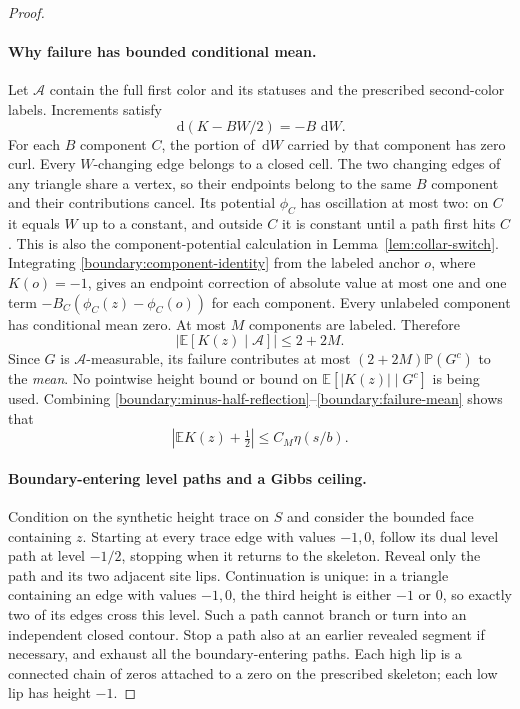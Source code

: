 \documentclass[11pt]{article}
\theoremstyle{definition}
\theoremstyle{remark}
\numberwithin{equation}{section}
\begin{document}
\begin{proof}
\paragraph{Why failure has bounded conditional mean.}
Let $\mathcal A$ contain the full first color and its statuses and
the prescribed second-color labels.  Increments satisfy
\begin{equation}
 \,\mathrm d(K-BW/2)=-B\,\,\mathrm d W.
 \label{boundary:component-identity}
\end{equation}
For each $B$ component $C$, the portion of $\,\mathrm d W$ carried by that
component has zero curl.  Every $W$-changing edge belongs to a closed
cell.  The two changing edges of any triangle share a vertex, so
their endpoints belong to the same $B$ component and their
contributions cancel.  Its potential $\phi_C$ has oscillation at most two:
on $C$ it equals $W$ up to a constant, and outside $C$ it is
constant until a path first hits $C$.  This is also the
component-potential calculation in Lemma~\ref{lem:collar-switch}.
Integrating \eqref{boundary:component-identity} from the labeled
anchor $o$, where $K(o)=-1$, gives an endpoint correction of absolute
value at most one and one term
$-B_C(\phi_C(z)-\phi_C(o))$ for each component.  Every unlabeled
component has conditional mean zero.  At most $M$ components are
labeled.  Therefore
\begin{equation}
 \big|\mathbb E[K(z)\mid\mathcal A]\big|\le 2+2M.
 \label{boundary:failure-mean}
\end{equation}
Since $G$ is $\mathcal A$-measurable, its failure contributes at most
$(2+2M)\mathbb P(G^c)$ to the \emph{mean}.  No pointwise height bound or
bound on $\mathbb E[|K(z)|\mid G^c]$ is being used.  Combining
\eqref{boundary:minus-half-reflection}--\eqref{boundary:failure-mean}
shows that
\begin{equation}
 \left|\mathbb E K(z)+\tfrac12\right|\le C_M\eta(s/b).
 \label{boundary:synthetic-mean}
\end{equation}

\paragraph{Boundary-entering level paths and a Gibbs ceiling.}
Condition on the synthetic height trace on $S$ and consider the
bounded face containing $z$.  Starting at every trace edge with
values $-1,0$, follow its dual level path at level $-1/2$, stopping
when it returns to the skeleton.  Reveal only the path and its two
adjacent site lips.  Continuation is unique: in a triangle containing
an edge with values $-1,0$, the third height is either $-1$ or $0$,
so exactly two of its edges cross this level.  Such a path cannot
branch or turn into an independent closed contour.  Stop a path also
at an earlier revealed segment if necessary, and exhaust all the
boundary-entering paths.  Each high lip is a connected chain of
zeros attached to a zero on the prescribed skeleton; each low lip
has height $-1$.


\end{proof}
\end{document}
